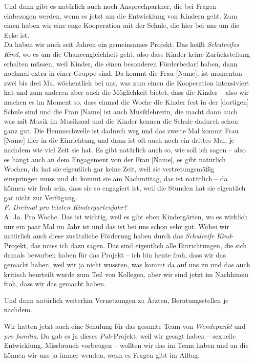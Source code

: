 \begin{linenumbers*}
Und dann gibt es natürlich auch noch Ansprechpartner, die bei Fragen einbezogen werden, wenn es jetzt um die Entwicklung von Kindern geht. Zum einen haben wir eine enge Kooperation mit der Schule, die hier bei uns um die Ecke ist.\\
Da haben wir auch seit Jahren ein gemeinsames Projekt. Das heißt \emph{Schulreifes Kind}, wo es um die Chancengleichheit geht, also dass Kinder keine Zurückstellung erhalten müssen, weil Kinder, die einen besonderen Förderbedarf haben, dann nochmal extra in einer Gruppe sind. Da kommt die Frau {[Name]}, ist momentan zwei bis drei Mal wöchentlich bei uns, was zum einen die Kooperation intensiviert hat und zum anderen aber auch die Möglichkeit bietet, dass die Kinder -- also wir machen es im Moment so, dass einmal die Woche die Kinder fest in der {[dortigen]} Schule sind und die Frau {[Name]} ist auch Musiklehrerin, die macht dann auch was mit Musik im Musiksaal und die Kinder kennen die Schule dadurch schon ganz gut. Die Hemmschwelle ist dadurch weg und das zweite Mal kommt Frau {[Name]} hier in die Einrichtung und dann ist oft auch noch ein drittes Mal, je nachdem wie viel Zeit sie hat. Es gibt natürlich auch so, wie soll ich sagen -- also es hängt auch an dem Engagement von der Frau {[Name]}, es gibt natürlich Wochen, da hat sie eigentlich gar keine Zeit, weil sie vertretungsmäßig einspringen muss und da kommt sie am Nachmittag, das ist natürlich -- da können wir froh sein, dass sie so engagiert ist, weil die Stunden hat sie eigentlich gar nicht zur Verfügung.\\
\emph{F: Dreimal pro letzten Kindergartenjahr?}\\
A: Ja. Pro Woche. Das ist wichtig, weil es gibt eben Kindergärten, wo es wirklich nur ein paar Mal im Jahr ist und das ist bei uns schon sehr gut. Wobei wir natürlich auch diese zusätzliche Förderung haben durch das \emph{Schulreife Kind}-Projekt, das muss ich dazu sagen. Das sind eigentlich alle Einrichtungen, die sich damals beworben haben für das Projekt -- ich bin heute froh, dass wir das gemacht haben, weil wir ja nicht wussten, was kommt da auf uns zu und das auch kritisch beurteilt wurde zum Teil von Kollegen, aber wir sind jetzt im Nachhinein froh, dass wir das gemacht haben.  

Und dann natürlich weiterhin Vernetzungen zu Ärzten, Beratungsstellen je nachdem.  

Wir hatten jetzt auch eine Schulung für das gesamte Team von \emph{Wendepunkt} und \emph{pro familia}. Da gab es ja dieses \emph{Puk}-Projekt, weil wir gesagt haben -- sexuelle Entwicklung, Missbrauch vorbeugen -- wollten wir das im Team haben und an die können wir uns ja immer wenden, wenn es Fragen gibt im Alltag.  


\end{linenumbers*}
